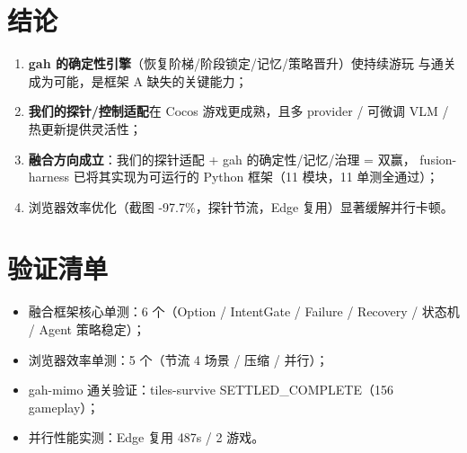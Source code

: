 \documentclass[11pt,a4paper]{article}
\begin{document}
\section{结论}
\begin{enumerate}[leftmargin=1.5em]
  \item \textbf{gah 的确定性引擎}（恢复阶梯/阶段锁定/记忆/策略晋升）使持续游玩
        与通关成为可能，是框架 A 缺失的关键能力；
  \item \textbf{我们的探针/控制适配}在 Cocos 游戏更成熟，且多 provider / 可微调
        VLM / 热更新提供灵活性；
  \item \textbf{融合方向成立}：我们的探针适配 + gah 的确定性/记忆/治理 = 双赢，
        fusion-harness 已将其实现为可运行的 Python 框架（11 模块，11 单测全通过）；
  \item 浏览器效率优化（截图 -97.7\%，探针节流，Edge 复用）显著缓解并行卡顿。
\end{enumerate}

\appendix
\section{验证清单}
\begin{itemize}[leftmargin=1.5em]
  \item 融合框架核心单测：6 个（Option / IntentGate / Failure / Recovery /
        状态机 / Agent 策略稳定）；
  \item 浏览器效率单测：5 个（节流 4 场景 / 压缩 / 并行）；
  \item gah-mimo 通关验证：tiles-survive SETTLED\_COMPLETE（156 gameplay）；
  \item 并行性能实测：Edge 复用 487s / 2 游戏。
\end{itemize}
\end{document}
